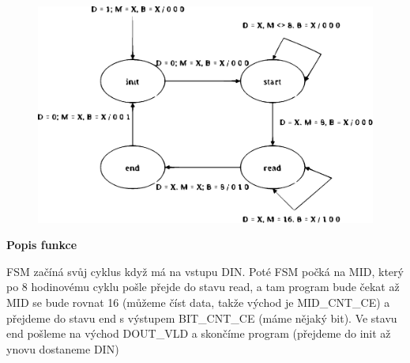 \documentclass[11pt,a4paper]{article}
\begin{document}
\bigskip

\begin{figure}[h]
    \centering
    \includegraphics[scale=0.75]{pic2.eps}
\end{figure}

\Large \textbf{\color{violet}}

\bigskip

\large \textbf{\color{violet}Popis funkce}

\bigskip

FSM začíná svůj cyklus když má na vstupu DIN. Poté FSM počká na MID, který po 8 hodinovému cyklu pošle přejde do stavu read, a tam program bude čekat až MID se bude rovnat 16 (můžeme číst data, takže východ je MID\_CNT\_CE) a přejdeme do stavu end s výstupem BIT\_CNT\_CE (máme nějaký bit). Ve stavu end pošleme na východ DOUT\_VLD a skončíme program (přejdeme do init až ynovu dostaneme DIN)
\end{document}
